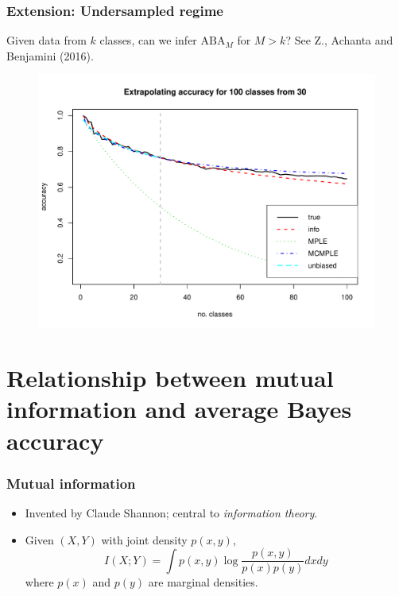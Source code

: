 \documentclass{beamer}
\begin{document}
\begin{frame}
\frametitle{Extension: Undersampled regime}
Given data from $k$ classes, can we infer $\text{ABA}_M$ for $M > k$?
See Z., Achanta and Benjamini (2016).
\begin{figure}
\centering
\includegraphics[scale = 0.4]{../info_theory_paper/cifar_example.pdf}
\end{figure}
\end{frame}

\section{Relationship between mutual information and average Bayes accuracy}

\begin{frame}
\sectionpage
\end{frame}


\begin{frame}
\frametitle{Mutual information}
\begin{itemize}
\item Invented by Claude Shannon; central to \emph{information theory}.
\item Given $(X, Y)$ with joint density $p(x, y)$,
\[
I(X; Y) = \int p(x, y) \log\frac{p(x, y)}{p(x) p(y)} dx dy
\]
where $p(x)$ and $p(y)$ are marginal densities.
\end{itemize}
\end{frame}
\end{document}
